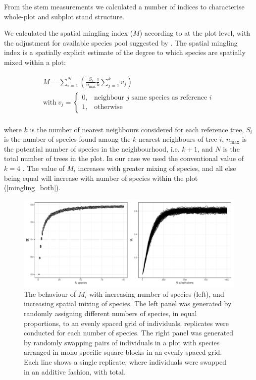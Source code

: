 \documentclass[11pt,a4paper]{article}
\begin{document}
From the stem measurements we calculated a number of indices to characterise whole-plot and subplot stand structure.

We calculated the spatial mingling index ($M$) according to \citet{Gadow2002} at the plot level, with the adjustment for available species pool suggested by \citet{Hui2011}. The spatial mingling index is a spatially explicit estimate of the degree to which species are spatially mixed within a plot:

\begin{gather}
	M = \sum_{i=1}^{N} (\frac{S_{i}}{n_{\text{max}}} \frac{1}{k} \sum_{j=1}^{k} v_{j})	\\
	\text{with}\ v_{j} = \begin{cases}
		0,& \text{neighbour $j$ same species as reference $i$} \\
		1,& \text{otherwise}
	\end{cases} \\
\end{gather}

where $k$ is the number of nearest neighbours considered for each reference tree, $S_{i}$ is the number of species found among the $k$ nearest neighbours of tree $i$, $n_{\text{max}}$ is the potential number of species in the neighbourhood, i.e. $k + 1$, and $N$ is the total number of trees in the plot. In our case we used the conventional value of $k = 4$ \citep{Gadow2002, Hui2004, Hui2007}. The value of $M_{i}$ increases with greater mixing of species, and all else being equal will increase with number of species within the plot (\autoref{mingling_both}).

\begin{figure}[H]
\centering
	\includegraphics[width=\textwidth]{mingling_both}
	\caption{The behaviour of $M_{i}$ with increasing number of species (left), and increasing spatial mixing of species. The left panel was generated by randomly assigning different numbers of species, in equal proportions, to an evenly spaced grid of individuals. \mispreps{} replicates were conducted for each number of species. The right panel was generated by randomly swapping pairs of individuals in a plot with \minsp{} species arranged in mono-specific square blocks in an evenly spaced grid. Each line shows a single replicate, where individuals were swapped in an additive fashion, with \minreps{} total.} 
	\label{mingling_both}
\end{figure}
\end{document}
